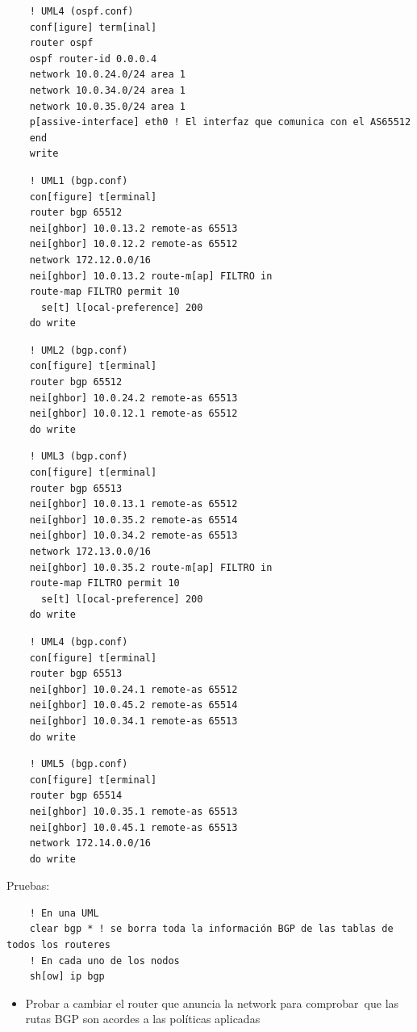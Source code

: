 \documentclass{article}
\begin{document}
  \begin{verbatim}
    ! UML4 (ospf.conf)
    conf[igure] term[inal]
    router ospf
    ospf router-id 0.0.0.4
    network 10.0.24.0/24 area 1
    network 10.0.34.0/24 area 1
    network 10.0.35.0/24 area 1
    p[assive-interface] eth0 ! El interfaz que comunica con el AS65512
    end
    write
  \end{verbatim}
  
  \begin{verbatim}
    ! UML1 (bgp.conf)
    con[figure] t[erminal]
    router bgp 65512
    nei[ghbor] 10.0.13.2 remote-as 65513
    nei[ghbor] 10.0.12.2 remote-as 65512
    network 172.12.0.0/16
    nei[ghbor] 10.0.13.2 route-m[ap] FILTRO in
    route-map FILTRO permit 10
      se[t] l[ocal-preference] 200
    do write
  \end{verbatim}
  
  \begin{verbatim}
    ! UML2 (bgp.conf)
    con[figure] t[erminal]
    router bgp 65512
    nei[ghbor] 10.0.24.2 remote-as 65513
    nei[ghbor] 10.0.12.1 remote-as 65512
    do write
  \end{verbatim}
  
  \begin{verbatim}
    ! UML3 (bgp.conf)
    con[figure] t[erminal]
    router bgp 65513
    nei[ghbor] 10.0.13.1 remote-as 65512
    nei[ghbor] 10.0.35.2 remote-as 65514
    nei[ghbor] 10.0.34.2 remote-as 65513
    network 172.13.0.0/16
    nei[ghbor] 10.0.35.2 route-m[ap] FILTRO in
    route-map FILTRO permit 10
      se[t] l[ocal-preference] 200
    do write
  \end{verbatim}
  
  \begin{verbatim}
    ! UML4 (bgp.conf)
    con[figure] t[erminal]
    router bgp 65513
    nei[ghbor] 10.0.24.1 remote-as 65512
    nei[ghbor] 10.0.45.2 remote-as 65514
    nei[ghbor] 10.0.34.1 remote-as 65513
    do write
  \end{verbatim}
  
  \begin{verbatim}
    ! UML5 (bgp.conf)
    con[figure] t[erminal]
    router bgp 65514
    nei[ghbor] 10.0.35.1 remote-as 65513
    nei[ghbor] 10.0.45.1 remote-as 65513
    network 172.14.0.0/16
    do write
  \end{verbatim}

  Pruebas:
  \begin{verbatim}
    ! En una UML
    clear bgp * ! se borra toda la información BGP de las tablas de todos los routeres
    ! En cada uno de los nodos
    sh[ow] ip bgp
  \end{verbatim}

  \begin{itemize}
    \item Probar a cambiar el router que anuncia la network para comprobar\
    que las rutas BGP son acordes a las políticas aplicadas
  \end{itemize}
\end{document}

